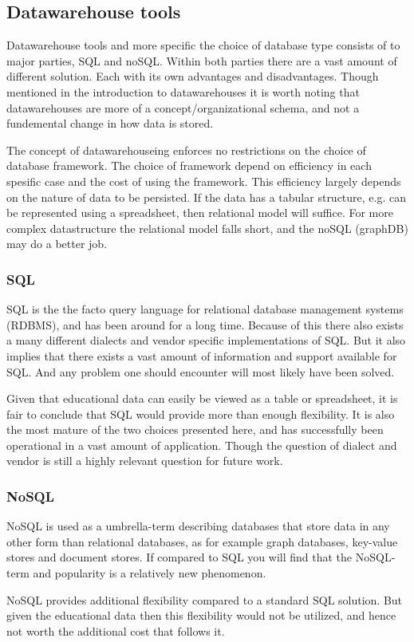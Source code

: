 \subsection{Datawarehouse tools}
Datawarehouse tools and more specific the choice of database type consists of to major parties, SQL and noSQL. 
Within both parties there are a vast amount of different solution. Each with its own advantages and disadvantages. 
Though mentioned in the introduction to datawarehouses it is worth noting that datawarehouses are more of a 
concept/organizational schema, and not a fundemental change in how data is stored. 

\bigskip\noindent
The concept of datawarehouseing enforces no restrictions on the choice of database framework.
The choice of framework depend on efficiency in each spesific case and the cost of using the framework.
This efficiency largely depends on the nature of data to be persisted.
If the data has a tabular structure, e.g. can be represented using a spreadsheet, then relational model will suffice. 
For more complex datastructure the relational model falls short, and the noSQL (graphDB) may do a better job.

\subsubsection{SQL}
	SQL is the the facto query language for relational database management systems (RDBMS), and has been around for a long time. 
	Because of this there also exists a many different dialects and vendor specific implementations of SQL. 
	But it also implies that there exists a vast amount of information and support available for SQL. 
	And any problem one should encounter will most likely have been solved.
	
	\bigskip\noindent
	Given that educational data can easily be viewed as a table or spreadsheet, 
	it is fair to conclude that SQL would provide more than enough flexibility.
	It is also the most mature of the two choices presented here, and has successfully been operational in a vast amount of application.
	Though the question of dialect and vendor is still a highly relevant question for future work. 
	
	
\subsubsection{NoSQL}
	NoSQL is used as a umbrella-term describing databases that store data in any other form than relational databases, as 
	for example graph databases, key-value stores and document stores. 
	If compared to SQL you will find that the NoSQL-term and popularity is a relatively new phenomenon. 
	
	\bigskip\noindent
	NoSQL provides additional flexibility compared to a standard SQL solution. 
	But given the educational data then this flexibility would not be utilized, 
	and hence not worth the additional cost that follows it.





